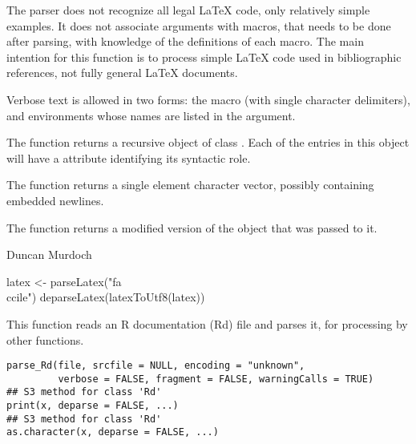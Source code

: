 %
\begin{Details}\relax

The parser does not recognize all legal LaTeX code, only relatively
simple examples.  It does not associate arguments with macros, that
needs to be done after parsing, with knowledge of the definitions of
each macro.  The main intention for this function is to process simple
LaTeX code used in bibliographic references, not fully general LaTeX
documents.

Verbose text is allowed in two forms:  the  macro (with
single character delimiters), and environments whose names are listed
in the  argument.

\end{Details}
%
\begin{Value}
The  function returns a recursive object of class
.  Each of the entries in this object will have a  attribute identifying its syntactic role.

The  function returns a single element character
vector, possibly containing embedded newlines.

The  function returns a modified version of the
 object that was passed to it.
\end{Value}
%
\begin{Author}\relax
Duncan Murdoch
\end{Author}
%
\begin{Examples}
\begin{ExampleCode}

latex <- parseLatex("fa\\c{c}ile")
deparseLatex(latexToUtf8(latex))
\end{ExampleCode}
\end{Examples}
%
\begin{Description}\relax
This function reads an R documentation (Rd) file and parses it, for
processing by other functions.
\end{Description}
%
\begin{Usage}
\begin{verbatim}
parse_Rd(file, srcfile = NULL, encoding = "unknown",
         verbose = FALSE, fragment = FALSE, warningCalls = TRUE)
## S3 method for class 'Rd'
print(x, deparse = FALSE, ...)
## S3 method for class 'Rd'
as.character(x, deparse = FALSE, ...)
\end{verbatim}
\end{Usage}
